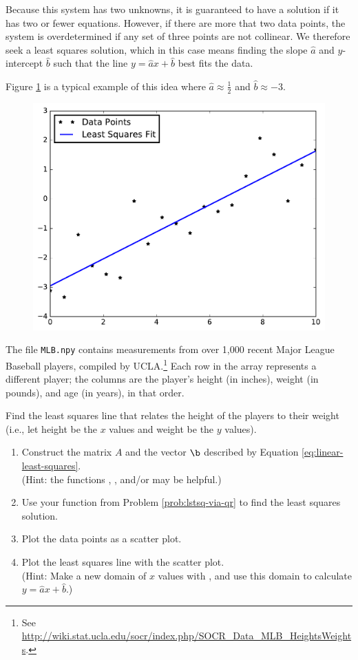 Because this system has two unknowns, it is guaranteed to have a solution if it has two or fewer equations.
However, if there are more that two data points, the system is overdetermined if any set of three points are not collinear.
We therefore seek a least squares solution, which in this case means finding the slope $\widehat{a}$ and $y$-intercept $\widehat{b}$ such that the line $y = \widehat{a}x+\widehat{b}$ best fits the data.

Figure \ref{fig:line-fit-example} is a typical example of this idea where $\widehat{a} \approx \frac{1}{2}$ and $\widehat{b} \approx -3$.

\begin{figure}[H] %
    \includegraphics[width=.59\textwidth]{figures/line_fit_example.pdf}
    \caption{}
    \label{fig:line-fit-example}
\end{figure}

\begin{problem} %
The file \texttt{MLB.npy} contains measurements from over 1,000 recent Major League Baseball players, compiled by UCLA.\footnote{See \url{http://wiki.stat.ucla.edu/socr/index.php/SOCR_Data_MLB_HeightsWeights}.}
Each row in the array represents a different player; the columns are the player's height (in inches), weight (in pounds), and age (in years), in that order.

Find the least squares line that relates the height of the players to their weight (i.e., let height be the $x$ values and weight be the $y$ values).
%
\begin{enumerate}
    \item Construct the matrix $A$ and the vector $\b$ described by Equation \ref{eq:linear-least-squares}.\\
    (Hint: the functions , , and/or  may be helpful.)
    \item Use your function from Problem \ref{prob:lstsq-via-qr} to find the least squares solution.
    \item Plot the data points as a scatter plot.
    \item Plot the least squares line with the scatter plot.\\
    (Hint: Make a new domain of $x$ values with , and use this domain to calculate $y = \widehat{a}x + \widehat{b}$.)
\end{enumerate}
\end{problem}

